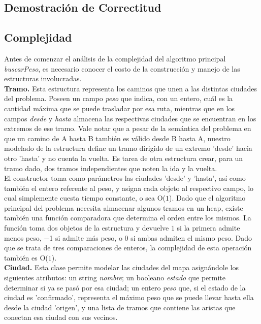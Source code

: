 \subsection{Demostración de Correctitud}


\subsection{Complejidad}

Antes de comenzar el análisis de la complejidad del algoritmo principal \textsl{buscarPeso}, es necesario conocer el costo de la construcción y manejo de las estructuras involucradas.\\

\textbf{Tramo.} Esta estructura representa los caminos que unen a las distintas ciudades del problema. Poseen un campo \textsl{peso} que indica, con un entero, cuál es la cantidad máxima que se puede trasladar por esa ruta, mientras que en los campos \textsl{desde} y \textsl{hasta} almacena las respectivas ciudades que se encuentran en los extremos de ese tramo. Vale notar que a pesar de la semántica del problema en que un camino de A hasta B también es válido desde B hasta A, nuestro modelado de la estructura define un tramo dirigido de un extremo 'desde' hacia otro 'hasta' y no cuenta la vuelta. Es tarea de otra estructura crear, para un tramo dado, dos tramos independientes que noten la ida y la vuelta.\\
\indent El constructor toma como parámetros las ciudades 'desde' y 'hasta', así como también el entero referente al peso, y asigna cada objeto al respectivo campo, lo cual simplemente cuesta tiempo constante, o sea O($1$). Dado que el algoritmo principal del problema necesita almacenar algunos tramos en un heap, existe también una función comparadora que determina el orden entre los mismos. La función toma dos objetos de la estructura y devuelve $1$ si la primera admite menos peso, $-$1 si admite más peso, o $0$ si ambas admiten el mismo peso. Dado que se trata de tres comparaciones de enteros, la complejidad de esta operación también es O($1$).\\
\indent \textbf{Ciudad.} Esta clase permite modelar las ciudades del mapa asignándole los siguientes atributos: un string \textsl{nombre}; un booleano \textsl{estado} que permite determinar si ya se pasó por esa ciudad; un entero \textsl{peso} que, si el estado de la ciudad es 'confirmado', representa el máximo peso que se puede llevar hasta ella desde la ciudad 'origen', y una lista de tramos que contiene las aristas que conectan esa ciudad con sus vecinos. \\
